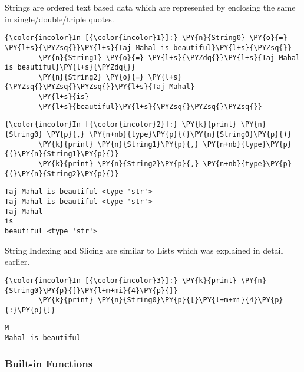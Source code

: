     Strings are ordered text based data which are represented by enclosing
the same in single/double/triple quotes.

    \begin{Verbatim}[commandchars=\\\{\}]
{\color{incolor}In [{\color{incolor}1}]:} \PY{n}{String0} \PY{o}{=} \PY{l+s}{\PYZsq{}}\PY{l+s}{Taj Mahal is beautiful}\PY{l+s}{\PYZsq{}}
        \PY{n}{String1} \PY{o}{=} \PY{l+s}{\PYZdq{}}\PY{l+s}{Taj Mahal is beautiful}\PY{l+s}{\PYZdq{}}
        \PY{n}{String2} \PY{o}{=} \PY{l+s}{\PYZsq{}\PYZsq{}\PYZsq{}}\PY{l+s}{Taj Mahal}
        \PY{l+s}{is}
        \PY{l+s}{beautiful}\PY{l+s}{\PYZsq{}\PYZsq{}\PYZsq{}}
\end{Verbatim}

    \begin{Verbatim}[commandchars=\\\{\}]
{\color{incolor}In [{\color{incolor}2}]:} \PY{k}{print} \PY{n}{String0} \PY{p}{,} \PY{n+nb}{type}\PY{p}{(}\PY{n}{String0}\PY{p}{)}
        \PY{k}{print} \PY{n}{String1}\PY{p}{,} \PY{n+nb}{type}\PY{p}{(}\PY{n}{String1}\PY{p}{)}
        \PY{k}{print} \PY{n}{String2}\PY{p}{,} \PY{n+nb}{type}\PY{p}{(}\PY{n}{String2}\PY{p}{)}
\end{Verbatim}

    \begin{Verbatim}[commandchars=\\\{\}]
Taj Mahal is beautiful <type 'str'>
Taj Mahal is beautiful <type 'str'>
Taj Mahal
is
beautiful <type 'str'>
    \end{Verbatim}

    String Indexing and Slicing are similar to Lists which was explained in
detail earlier.

    \begin{Verbatim}[commandchars=\\\{\}]
{\color{incolor}In [{\color{incolor}3}]:} \PY{k}{print} \PY{n}{String0}\PY{p}{[}\PY{l+m+mi}{4}\PY{p}{]}
        \PY{k}{print} \PY{n}{String0}\PY{p}{[}\PY{l+m+mi}{4}\PY{p}{:}\PY{p}{]}
\end{Verbatim}

    \begin{Verbatim}[commandchars=\\\{\}]
M
Mahal is beautiful
    \end{Verbatim}

    \subsubsection{Built-in Functions}\label{built-in-functions}

